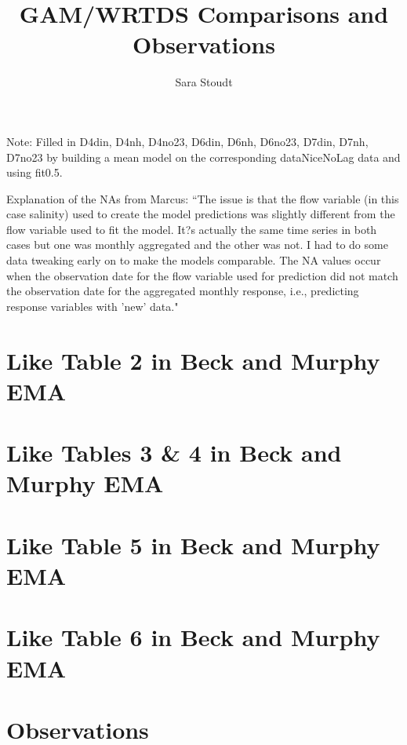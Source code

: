 \documentclass[12pt]{amsart}
\title{GAM/WRTDS Comparisons and Observations}
\author{Sara Stoudt}
\begin{document}
\maketitle

Note: Filled in D4din, D4nh, D4no23, D6din, D6nh, D6no23, D7din, D7nh, D7no23 by building a mean model on the corresponding dataNiceNoLag data and using fit0.5.

Explanation of the NAs from Marcus: ``The issue is that the flow variable (in this case salinity) used to create the model predictions was slightly different from the flow variable used to fit the model.  It?s actually the same time series in both cases but one was monthly aggregated and the other was not. I had to do some data tweaking early on to make the models comparable.  The NA values occur when the observation date for the flow variable used for prediction did not match the observation date for the aggregated monthly response, i.e., predicting response variables with 'new' data."

\section{Like Table 2 in Beck and Murphy EMA}







\section{Like Tables 3 \& 4 in Beck and Murphy EMA}




\section{Like Table 5 in Beck and Murphy EMA}




\section{Like Table 6 in Beck and Murphy EMA}




\section{Observations}
\end{document}
